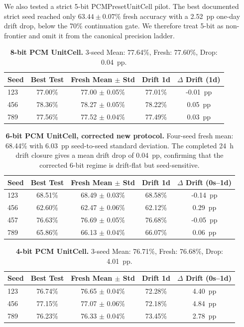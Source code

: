 We also tested a strict 5-bit PCMPresetUnitCell pilot. The best documented strict seed reached only \(63.44\pm0.07\%\) fresh accuracy with a 2.52~pp one-day drift drop, below the 70\% continuation gate. We therefore treat 5-bit as non-frontier and omit it from the canonical precision ladder.

\begin{table}[htbp]
\centering
\caption{\textbf{8-bit PCM UnitCell.} 3-seed Mean: 77.64\%, Fresh: 77.60\%, Drop: 0.04~pp.}
\label{tab:supp_8bit_pcm}
\begin{tabular}{lcccc}
\toprule
\textbf{Seed} & \textbf{Best Test} & \textbf{Fresh Mean $\pm$ Std} & \textbf{Drift 1d} & \textbf{$\Delta$ Drift (1d)} \\
\midrule
123 & 77.00\% & 77.00 $\pm$ 0.05\% & 77.01\% & -0.01~pp \\
456 & 78.36\% & 78.27 $\pm$ 0.05\% & 78.22\% & 0.05~pp \\
789 & 77.56\% & 77.52 $\pm$ 0.04\% & 77.49\% & 0.03~pp \\
\bottomrule
\end{tabular}
\end{table}

\begin{table}[htbp]
\centering
\caption{\textbf{6-bit PCM UnitCell, corrected new protocol.} Four-seed fresh mean: 68.44\% with 6.03~pp seed-to-seed standard deviation. The completed 24~h drift closure gives a mean drift drop of 0.04~pp, confirming that the corrected 6-bit regime is drift-flat but seed-sensitive.}
\label{tab:supp_6bit_pcm}
\begin{tabular}{lcccc}
\toprule
\textbf{Seed} & \textbf{Best Test} & \textbf{Fresh Mean $\pm$ Std} & \textbf{Drift 1d} & \textbf{$\Delta$ Drift (0s--1d)} \\
\midrule
123 & 68.51\% & 68.49 $\pm$ 0.03\% & 68.58\% & -0.14~pp \\
456 & 62.60\% & 62.47 $\pm$ 0.06\% & 62.12\% & 0.29~pp \\
457 & 76.63\% & 76.69 $\pm$ 0.05\% & 76.68\% & -0.05~pp \\
789 & 65.86\% & 66.13 $\pm$ 0.04\% & 66.07\% & 0.06~pp \\
\bottomrule
\end{tabular}
\end{table}

\begin{table}[htbp]
\centering
\caption{\textbf{4-bit PCM UnitCell.} 3-seed Mean: 76.71\%, Fresh: 76.68\%, Drop: 4.01~pp.}
\label{tab:supp_4bit_pcm}
\begin{tabular}{lcccc}
\toprule
\textbf{Seed} & \textbf{Best Test} & \textbf{Fresh Mean $\pm$ Std} & \textbf{Drift 1d} & \textbf{$\Delta$ Drift (0s--1d)} \\
\midrule
123 & 76.74\% & 76.65 $\pm$ 0.04\% & 72.28\% & 4.40~pp \\
456 & 77.15\% & 77.07 $\pm$ 0.06\% & 72.18\% & 4.84~pp \\
789 & 76.23\% & 76.33 $\pm$ 0.04\% & 73.45\% & 2.78~pp \\
\bottomrule
\end{tabular}
\end{table}


